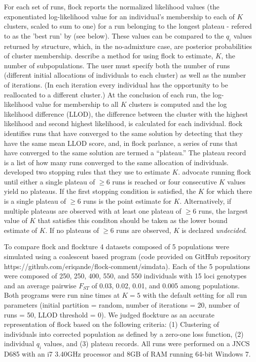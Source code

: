 For each set of runs, {\sc flock} reports the 
normalized likelihood values (the exponentiated log-likelihood value for an individual's 
membership to each of $K$ clusters, scaled to sum to one) for a run belonging to the 
longest plateau - refered to as the 'best run' by \citep{Duc&Tur2012} (see below).
These values can be compared to the $q_i$ values
returned by {\sc structure}, which, in the no-admixture case, are posterior 
probabilities of cluster membership. \citet{Duc&Tur2012} describe a method 
for using {\sc flock} to estimate, $K$, the number of
subpopulations. The user must specify both the number of runs (different initial allocations of individuals 
to each cluster) as well as the number of iterations. (In each iteration every individual 
has the opportunity to be reallocated 
to a different cluster.) At the conclusion of each run, the log-likelihood value for 
membership to all $K$ clusters is computed
and the log likelihood difference (LLOD), the difference between the cluster with the highest likelihood 
and second highest likelihood, is calculated for each individual. {\sc flock} identifies runs that 
have converged to the same solution by detecting that they have the same mean LLOD score, and, in 
{\sc flock} parlance, a series of runs that have converged to the same solution are termed a ``plateau.'' 
The plateau record is a list of how many runs converged to the same allocation
of individuals. \citet{Duc&Tur2012} developed two stopping rules that they use to estimate $K$. 
\citet{Duc&Tur2012} advocate running  {\sc flock} until either a single plateau of
$\geq 6$ runs is reached or four consecutive $K$ values yield no plateaus. If the first stopping condition is satisfied,
the $K$ for which there is a single plateau of $\geq 6$ runs is the point estimate for $K$. Alternatively, 
if multiple plateaus are observed with at least one plateau of $\geq 6$ runs, the largest value of $K$ that satisfies 
this conditon should be taken as the lower bound estimate of $K$. If no plateaus of $\geq 6$ runs are observed, $K$
is declared {\em undecided}.

To compare {\sc flock} and {\sc flockture} 4 datasets composed of 5 populations
were simulated using a coalescent based program (code provided on GitHub repository 
https://github.com/eriqande/flock-comment/simdata). Each of the 5 populations
were composed of 250, 250, 400, 550, and 550 individuals with 15 loci genotypes
and an average pairwise $F_{ST}$ of 0.03, 0.02, 0.01, and 0.005 among
populations. Both programs were run nine times at $K=5$ with the default setting for all 
run parameters (initial partition = random, number of iterations = 20, number of runs = 50, 
LLOD threshold = 0). We judged {\sc flockture} as an accurate representation of {\sc flock} based on the
following criteria: (1) Clustering of individuals into corrected population as defined by a zero-one loss function, 
(2) individual $q_i$ values, and (3) plateau records. All runs were performed on a JNCS D685 with an i7 3.40GHz 
processor and 8GB of RAM running 64-bit Windows 7. 

